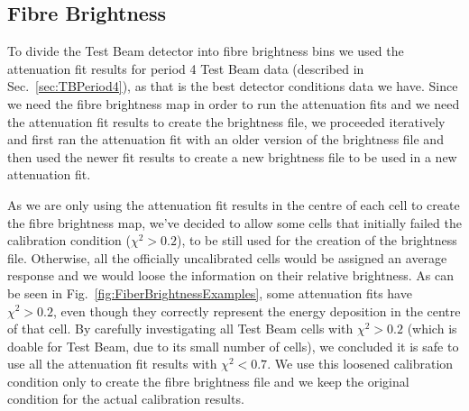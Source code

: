 


\subsection{Fibre Brightness}\label{sec:FibreBrightnessTB}

To divide the Test Beam detector into fibre brightness bins we used the attenuation fit results for period 4 Test Beam data (described in Sec.~\ref{sec:TBPeriod4}), as that is the best detector conditions data we have. Since we need the fibre brightness map in order to run the attenuation fits and we need the attenuation fit results to create the brightness file, we proceeded iteratively and first ran the attenuation fit with an older version of the brightness file and then used the newer fit results to create a new brightness file to be used in a new attenuation fit.

As we are only using the attenuation fit results in the centre of each cell to create the fibre brightness map, we've decided to allow some cells that initially failed the calibration condition ($\chi^2>0.2$), to be still used for the creation of the brightness file. Otherwise, all the officially uncalibrated cells would be assigned an average response and we would loose the information on their relative brightness. As can be seen in Fig.~\ref{fig:FiberBrightnessExamples}, some attenuation fits have $\chi^2>0.2$, even though they correctly represent the energy deposition in the centre of that cell. By carefully investigating all Test Beam cells with $\chi^2>0.2$ (which is doable for Test Beam, due to its small number of cells), we concluded it is safe to use all the attenuation fit results with $\chi^2<0.7$. We use this loosened calibration condition only to create the fibre brightness file and we keep the original condition for the actual calibration results.

